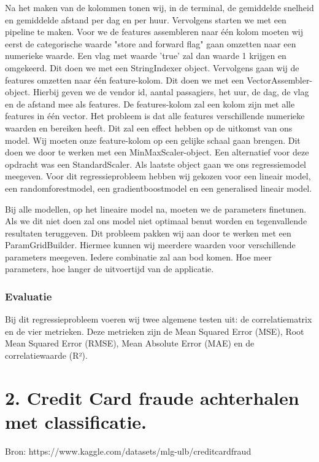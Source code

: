 \documentclass[a4paper,12pt,twoside]{report}
\begin{document}
Na het maken van de kolommen tonen wij, in de terminal, de gemiddelde snelheid en gemiddelde afstand per dag en per huur. Vervolgens starten we met een pipeline te maken. Voor we de features assembleren naar één kolom moeten wij eerst de categorische waarde "store and forward flag" gaan omzetten naar een numerieke waarde. Een vlag met waarde 'true' zal dan waarde 1 krijgen en omgekeerd. Dit doen we met een StringIndexer object. Vervolgens gaan wij de features omzetten naar één feature-kolom. Dit doen we met een VectorAssembler-object. Hierbij geven we de vendor id, aantal passagiers, het uur, de dag, de vlag en de afstand mee als features. De features-kolom zal een kolom zijn met alle features in één vector. Het probleem is dat alle features verschillende numerieke waarden en bereiken heeft. Dit zal een effect hebben op de uitkomst van ons model. Wij moeten onze feature-kolom op een gelijke schaal gaan brengen. Dit doen we door te werken met een MinMaxScaler-object. Een alternatief voor deze opdracht was een StandardScaler. Als laatste object gaan we ons regressiemodel meegeven. Voor dit regressieprobleem hebben wij gekozen voor een lineair model, een randomforestmodel, een gradientboostmodel en een generalised lineair model.

Bij alle modellen, op het lineaire model na, moeten we de parameters finetunen. Als we dit niet doen zal ons model niet optimaal benut worden en tegenvallende resultaten teruggeven. Dit probleem pakken wij aan door te werken met een ParamGridBuilder. Hiermee kunnen wij meerdere waarden voor verschillende parameters meegeven. Iedere combinatie zal aan bod komen. Hoe meer parameters, hoe langer de uitvoertijd van de applicatie.

\subsection*{Evaluatie}

Bij dit regressieprobleem voeren wij twee algemene testen uit: de correlatiematrix en de vier metrieken. Deze metrieken zijn de Mean Squared Error (MSE), Root Mean Squared Error (RMSE), Mean Absolute Error (MAE) en de correlatiewaarde (R²).


\chapter*{2. Credit Card fraude achterhalen met classificatie. }

Bron: https://www.kaggle.com/datasets/mlg-ulb/creditcardfraud
\end{document}
